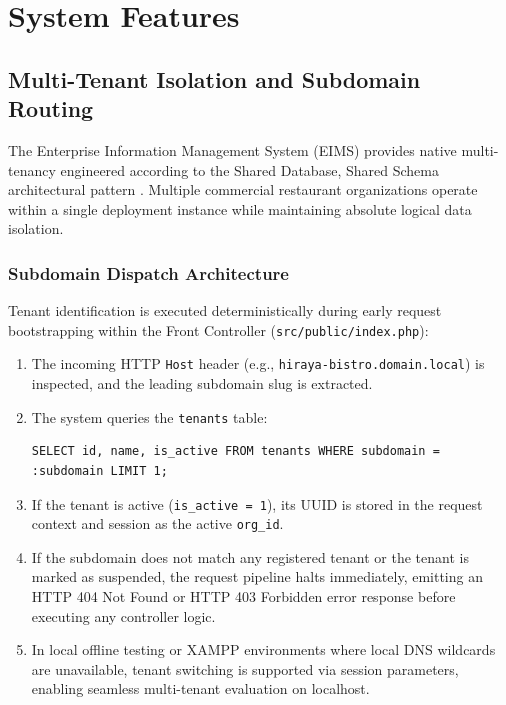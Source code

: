\chapter{System Features}
\label{chap:system_features}

\section{Multi-Tenant Isolation and Subdomain Routing}
\label{sec:feat_multitenancy}
The Enterprise Information Management System (EIMS) provides native multi-tenancy engineered according to the Shared Database, Shared Schema architectural pattern \parencite{chong2006multi, bezemer2010multitenant}. Multiple commercial restaurant organizations operate within a single deployment instance while maintaining absolute logical data isolation.

\subsection{Subdomain Dispatch Architecture}
Tenant identification is executed deterministically during early request bootstrapping within the Front Controller (\texttt{src/public/index.php}):
\begin{enumerate}
    \item The incoming HTTP \texttt{Host} header (e.g., \texttt{hiraya-bistro.domain.local}) is inspected, and the leading subdomain slug is extracted.
    \item The system queries the \texttt{tenants} table:
    \begin{lstlisting}[language=SQLANSI]
    SELECT id, name, is_active FROM tenants WHERE subdomain = :subdomain LIMIT 1;
    \end{lstlisting}
    \item If the tenant is active (\texttt{is\_active = 1}), its UUID is stored in the request context and session as the active \texttt{org\_id}.
    \item If the subdomain does not match any registered tenant or the tenant is marked as suspended, the request pipeline halts immediately, emitting an HTTP 404 Not Found or HTTP 403 Forbidden error response before executing any controller logic.
    \item In local offline testing or XAMPP environments where local DNS wildcards are unavailable, tenant switching is supported via session parameters, enabling seamless multi-tenant evaluation on localhost.
\end{enumerate}

